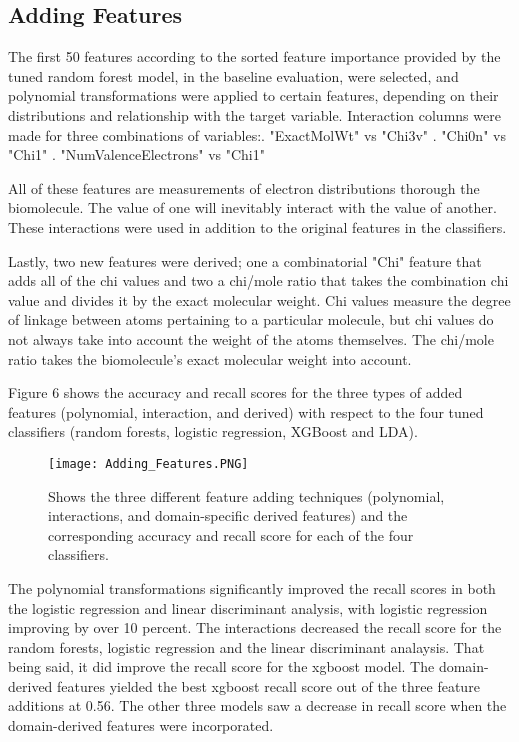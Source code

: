 \documentclass{article}
\begin{document}
\begin{itemize}
\subsection{Adding Features}

The first 50 features according to the sorted feature importance provided by the tuned random forest model, in the baseline evaluation, were selected, and polynomial transformations were applied to certain features, depending on their distributions and relationship with the target variable. Interaction columns were made for three combinations of variables:\newline {}. "ExactMolWt" vs "Chi3v" . "Chi0n" vs "Chi1" . "NumValenceElectrons" vs "Chi1" \newline

All of these features are measurements of electron distributions thorough the biomolecule. The value of one will inevitably interact with the value of another. These interactions were used in addition to the original features in the classifiers. 

Lastly, two new features were derived; one a combinatorial "Chi" feature that adds all of the chi values and two a chi/mole ratio that takes the combination chi value and divides it by the exact molecular weight. Chi values measure the degree of linkage between atoms pertaining to a particular molecule, but chi values do not always take into account the weight of the atoms themselves. The chi/mole ratio takes the biomolecule's exact molecular weight into account. \newline

Figure 6 shows the accuracy and recall scores for the three types of added features (polynomial, interaction, and derived) with respect to the four tuned classifiers (random forests, logistic regression, XGBoost and LDA). 



\begin{figure}[hbt!]
\texttt{[image: Adding\_Features.PNG]}
\caption{Shows the three different feature adding techniques (polynomial, interactions, and domain-specific derived features) and the corresponding accuracy and recall score for each of the four classifiers.}
\end{figure}


The polynomial transformations significantly improved the recall scores in both the logistic regression and linear discriminant analysis, with logistic regression improving by over 10 percent. The interactions decreased the recall score for the random forests, logistic regression and the linear discriminant analaysis. That being said, it did improve the recall score for the xgboost model. The domain-derived features yielded the best xgboost recall score out of the three feature additions at 0.56. The other three models saw a decrease in recall score when the domain-derived features were incorporated. 



\end{itemize}
\end{document}
